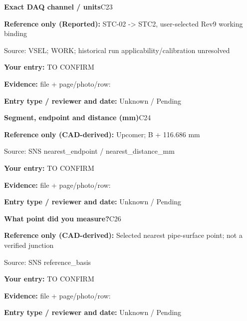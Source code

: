 \documentclass[11pt]{article}
\begin{document}
\par\noindent\begin{minipage}{\textwidth}\small
{\color{navy}\bfseries Exact DAQ channel / units}\hfill C23\par
\colorbox{pale}{\parbox{\dimexpr\linewidth-2\fboxsep\relax}{
\textbf{Reference only (Reported):} STC-02 -> STC2, user-selected Rev9 working binding\par
{\footnotesize Source: VSEL; WORK; historical run applicability/calibration unresolved}}}\par
\textbf{Your entry:} {\color{muted}TO CONFIRM}\enspace\hrulefill\par
{\footnotesize\textbf{Evidence:} file + page/photo/row: \hrulefill\par
\textbf{Entry type / reviewer and date:} Unknown / Pending\par
}\end{minipage}\par\vspace{5pt}
\par\noindent\begin{minipage}{\textwidth}\small
{\color{navy}\bfseries Segment, endpoint and distance (mm)}\hfill C24\par
\colorbox{pale}{\parbox{\dimexpr\linewidth-2\fboxsep\relax}{
\textbf{Reference only (CAD-derived):} Upcomer; B + 116.686 mm\par
{\footnotesize Source: SNS nearest\_\allowbreak{}endpoint / nearest\_\allowbreak{}distance\_\allowbreak{}mm}}}\par
\textbf{Your entry:} {\color{muted}TO CONFIRM}\enspace\hrulefill\par
{\footnotesize\textbf{Evidence:} file + page/photo/row: \hrulefill\par
\textbf{Entry type / reviewer and date:} Unknown / Pending\par
}\end{minipage}\par\vspace{5pt}
\par\noindent\begin{minipage}{\textwidth}\small
{\color{navy}\bfseries What point did you measure?}\hfill C26\par
\colorbox{pale}{\parbox{\dimexpr\linewidth-2\fboxsep\relax}{
\textbf{Reference only (CAD-derived):} Selected nearest pipe-surface point; not a verified junction\par
{\footnotesize Source: SNS reference\_\allowbreak{}basis}}}\par
\textbf{Your entry:} {\color{muted}TO CONFIRM}\enspace\hrulefill\par
{\footnotesize\textbf{Evidence:} file + page/photo/row: \hrulefill\par
\textbf{Entry type / reviewer and date:} Unknown / Pending\par
}\end{minipage}\par\vspace{5pt}
\end{document}
